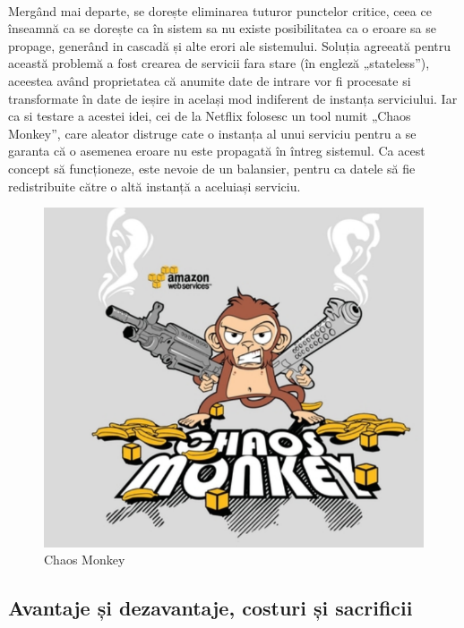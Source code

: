 \documentclass[12pt]{report}
\begin{document}
	\paragraph{}Mergând mai departe, se dorește eliminarea tuturor punctelor critice, ceea ce înseamnă ca se dorește ca în sistem sa nu existe posibilitatea ca o eroare sa se propage, generând in cascadă și alte erori ale sistemului. Soluția agreeată pentru această problemă a fost crearea de servicii fara stare (în engleză „stateless”), aceestea având proprietatea că anumite date de intrare vor fi procesate si transformate în date de ieșire in același mod indiferent de instanța serviciului. Iar ca si testare a acestei idei, cei de la Netflix folosesc un tool numit „Chaos Monkey”, care aleator distruge cate o instanța al unui serviciu pentru a se garanta că o asemenea eroare nu este propagată în întreg sistemul. Ca acest concept să funcționeze, este nevoie de un balansier, pentru ca datele să fie redistribuite către o altă instanță a aceluiași serviciu.
	\begin{figure}[h]
  	\centering
  	\includegraphics[scale=.5]{chaos}
	\caption{Chaos Monkey}  
	\label{chaosMonkey}
  	\end{figure}
	\subsection{Avantaje și dezavantaje, costuri și sacrificii}
\end{document}
